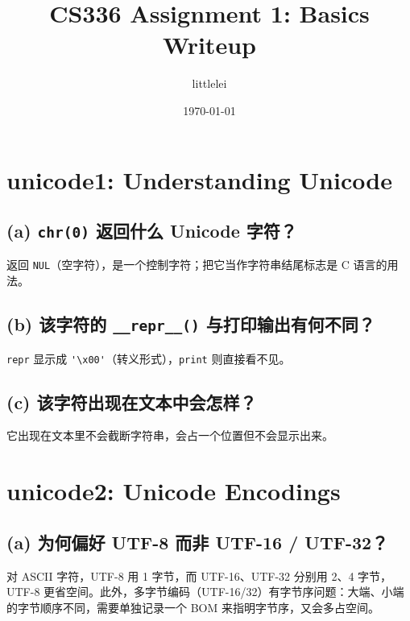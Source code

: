 \documentclass[12pt]{ctexart}
\title{CS336 Assignment 1: Basics\\\large Writeup}
\author{littlelei}
\date{\today}
\begin{document}
\maketitle


\section{unicode1: Understanding Unicode}

\subsection{(a) \texttt{chr(0)} 返回什么 Unicode 字符？}
返回 \texttt{NUL}（空字符），是一个控制字符；把它当作字符串结尾标志是 C 语言的用法。

\subsection{(b) 该字符的 \texttt{\_\_repr\_\_()} 与打印输出有何不同？}
\texttt{repr} 显示成 \verb|'\x00'|（转义形式），\texttt{print} 则直接看不见。

\subsection{(c) 该字符出现在文本中会怎样？}
它出现在文本里不会截断字符串，会占一个位置但不会显示出来。

\section{unicode2: Unicode Encodings}

\subsection{(a) 为何偏好 UTF-8 而非 UTF-16 / UTF-32？}
对 ASCII 字符，UTF-8 用 1 字节，而 UTF-16、UTF-32 分别用 2、4 字节，UTF-8 更省空间。此外，多字节编码（UTF-16/32）有字节序问题：大端、小端的字节顺序不同，需要单独记录一个 BOM 来指明字节序，又会多占空间。
\end{document}
